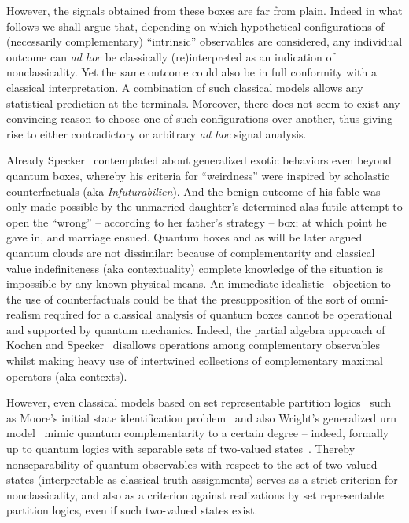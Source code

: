 \documentclass[%
  reprint,
  twocolumn,
 showpacs,
 showkeys,
 preprintnumbers,
 amsmath,amssymb,
 aps,
  prl,
  longbibliography,
 ]{revtex4-1}
\begin{document}
However, the signals obtained from these boxes are far from plain.
Indeed in what follows we shall  argue that,
depending on which hypothetical configurations of (necessarily complementary) ``intrinsic'' observables are
considered, any individual outcome can {\it ad hoc} be classically (re)interpreted as an indication of nonclassicality.
Yet the same outcome could also be in full conformity with a classical interpretation.
A combination of such classical models allows any statistical prediction at the terminals.
Moreover,
there does not seem to exist any convincing reason to choose one
of such configurations over another, thus giving rise to either contradictory or arbitrary {\it ad hoc} signal analysis.

Already Specker~\cite{specker-60} contemplated about generalized exotic behaviors even beyond quantum boxes,
whereby his criteria for ``weirdness'' were inspired by scholastic counterfactuals
(aka {\it Infuturabilien}).
And
the benign outcome of his fable was only made possible by the unmarried daughter's determined alas futile attempt to open
the ``wrong'' -- according to her father's strategy -- box; at which point he gave in, and marriage ensued.
Quantum boxes and as will be later argued quantum clouds are not dissimilar: because
of complementarity
and classical value indefiniteness (aka contextuality)
complete knowledge of the situation is impossible by any known physical means.
An immediate idealistic~\cite{berkeley,stace,Goldschmidt2017-idealism}
objection to the use of counterfactuals could
be that the presupposition of the sort of omni-realism required for a classical analysis of quantum boxes
cannot be operational~\cite{bridgman} and supported by quantum mechanics.
Indeed, the partial algebra approach of Kochen and Specker~\cite{kochen2,kochen3,kochen1}
disallows operations among complementary observables
whilst making heavy use of intertwined collections of complementary maximal operators (aka contexts).


However, even classical models based on set representable partition logics~\cite{svozil-2001-eua}
such as Moore's initial state identification problem~\cite{e-f-moore}
and also Wright's generalized urn model~\cite{wright:pent,wright}
mimic quantum complementarity to a certain degree -- indeed,
formally up to quantum logics with separable sets of two-valued states~\cite[Theorem~0, p.~67]{kochen1}.
Thereby nonseparability of quantum observables with respect to the set
of two-valued states (interpretable as classical truth assignments)
serves as a strict criterion for nonclassicality,
and also as a criterion against realizations by set representable partition logics,
even if such two-valued states exist.
\end{document}
